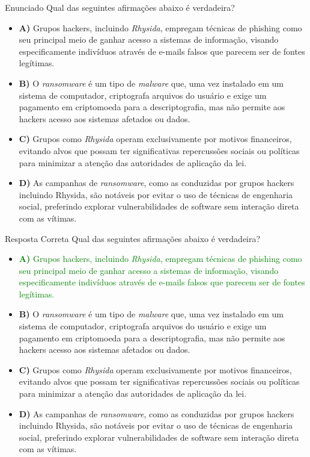 \documentclass[bookmarks=false,aspectratio=169,9pt]{beamer}
\begin{document}
\begin{frame}{Enunciado}
	Qual das seguintes afirmações abaixo é verdadeira?
	\begin{itemize}

		\item \textbf{A)} Grupos hackers, incluindo \textit{Rhysida}, empregam técnicas de phishing como seu principal meio de ganhar acesso a sistemas de informação, visando especificamente indivíduos através de e-mails falsos que parecem ser de fontes legítimas.

		\item \textbf{B)} O \textit{ransomware} é um tipo de \textit{malware} que, uma vez instalado em um sistema de computador, criptografa arquivos do usuário e exige um pagamento em criptomoeda para a descriptografia, mas não permite aos hackers acesso aos sistemas afetados ou dados.

		\item \textbf{C)} Grupos como \textit{Rhysida} operam exclusivamente por motivos financeiros, evitando alvos que possam ter significativas repercussões sociais ou políticas para minimizar a atenção das autoridades de aplicação da lei.

		\item \textbf{D)} As campanhas de \textit{ransomware}, como as conduzidas por grupos hackers incluindo Rhysida, são notáveis por evitar o uso de técnicas de engenharia social, preferindo explorar vulnerabilidades de software sem interação direta com as vítimas.
	\end{itemize}
\end{frame}
\begin{frame}{Resposta Correta}
	Qual das seguintes afirmações abaixo é verdadeira?
	\begin{itemize}

		\item \textcolor{green}{\textbf{A)} Grupos hackers, incluindo \textit{Rhysida}, empregam técnicas de phishing como seu principal meio de ganhar acesso a sistemas de informação, visando especificamente indivíduos através de e-mails falsos que parecem ser de fontes legítimas.}

		\item \textbf{B)} O \textit{ransomware} é um tipo de \textit{malware} que, uma vez instalado em um sistema de computador, criptografa arquivos do usuário e exige um pagamento em criptomoeda para a descriptografia, mas não permite aos hackers acesso aos sistemas afetados ou dados.

		\item \textbf{C)} Grupos como \textit{Rhysida} operam exclusivamente por motivos financeiros, evitando alvos que possam ter significativas repercussões sociais ou políticas para minimizar a atenção das autoridades de aplicação da lei.

		\item \textbf{D)} As campanhas de \textit{ransomware}, como as conduzidas por grupos hackers incluindo Rhysida, são notáveis por evitar o uso de técnicas de engenharia social, preferindo explorar vulnerabilidades de software sem interação direta com as vítimas.
	\end{itemize}
\end{frame}
\end{document}
